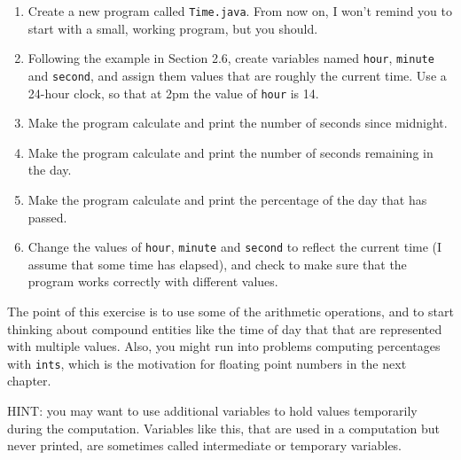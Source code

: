 \begin{exercise}

\begin{enumerate}

\item Create a new program called {\tt Time.java}.  From now
on, I won't remind you to start with a small, working program,
but you should.

\item Following the example in Section 2.6, create variables
named {\tt hour}, {\tt minute} and {\tt second}, and assign
them values that are roughly the current time.  Use a 24-hour
clock, so that at 2pm the value of {\tt hour} is 14.

\item Make the program calculate and print the number of
seconds since midnight.

\item Make the program calculate and print the number of
seconds remaining in the day.

\item Make the program calculate and print the percentage of
the day that has passed.

\item Change the values of {\tt hour}, {\tt minute} and {\tt second}
to reflect the current time (I assume that some time has elapsed), and
check to make sure that the program works correctly with different
values.

\end{enumerate}

The point of this exercise is to use some of the arithmetic
operations, and to start thinking about compound entities like the
time of day that that are represented with multiple values.  Also,
you might run into problems computing percentages with {\tt ints},
which is the motivation for floating point numbers in the next
chapter.

HINT: you may want to use additional variables to hold values
temporarily during the computation.  Variables like this, that
are used in a computation but never printed, are sometimes called
intermediate or temporary variables.

\end{exercise}



